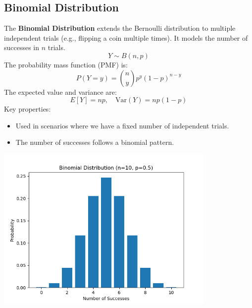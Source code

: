 \documentclass{article}
\begin{document}
\subsection{Binomial Distribution}
The \textbf{Binomial Distribution} extends the Bernoulli distribution to multiple independent trials (e.g., flipping a coin multiple times). It models the number of successes in \(n\) trials.
\[
Y \sim B(n, p)
\]
The probability mass function (PMF) is:
\[
P(Y = y) = \binom{n}{y} p^y {(1 - p)}^{n - y}
\]
The expected value and variance are:
\[
E[Y] = np, \quad \text{Var}(Y) = np(1 - p)
\]
Key properties:
\begin{itemize}
    \item Used in scenarios where we have a fixed number of independent trials.
    \item The number of successes follows a binomial pattern.
\end{itemize}
\begin{center}
    \includegraphics[width=0.8\textwidth]{./graphs/probDist/binomial_distribution.png}
\end{center}

\newpage
\end{document}
